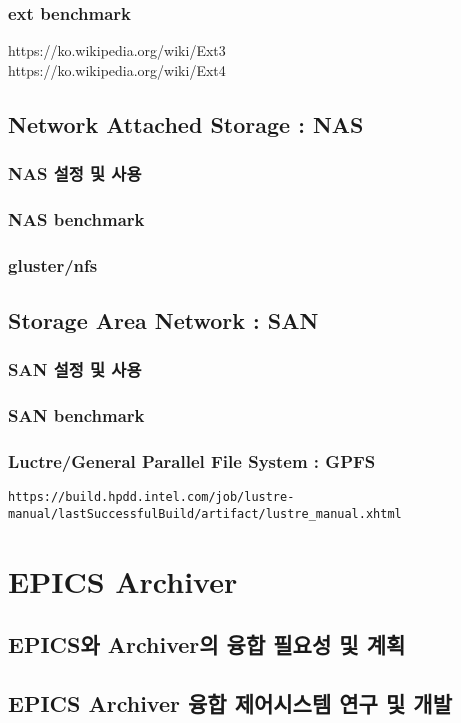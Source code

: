 \documentclass[11pt
  , a4paper
  , article
  , oneside
]{memoir}
\begin{document}
\subsection{ext benchmark}
https://ko.wikipedia.org/wiki/Ext3\\
https://ko.wikipedia.org/wiki/Ext4
\section{Network Attached Storage : NAS}
\subsection{NAS 설정 및 사용}
\subsection{NAS benchmark}
\subsection{gluster/nfs}
\section{Storage Area Network : SAN}
\subsection{SAN 설정 및 사용}
\subsection{SAN benchmark}
\subsection{Luctre/General Parallel File System : GPFS}
\begin{lstlisting}[style=termstyle]
https://build.hpdd.intel.com/job/lustre-manual/lastSuccessfulBuild/artifact/lustre_manual.xhtml
\end{lstlisting}

\chapter{EPICS Archiver}
\section{EPICS와 Archiver의 융합 필요성 및 계획}
\section{EPICS Archiver 융합 제어시스템 연구 및 개발}
\end{document}
